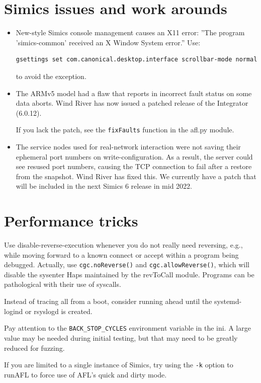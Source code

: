 \documentclass[titlepage]{article}
\begin{document}
\begin{appendices}
\section{Simics issues and work arounds}
\begin{itemize}
\item New-style Simics console management causes an X11 error: ''The program 'simics-common' received an X Window System error.''
Use:
\begin{verbatim}
gsettings set com.canonical.desktop.interface scrollbar-mode normal
\end{verbatim}
\noindent to avoid the exception.
\item The ARMv5 model had a flaw that reports in incorrect fault status on some data aborts.  Wind River has now issued a patched release
of the Integrator (6.0.12).

If you lack the patch, see the {\tt fixFaults} function in the afl.py module.

\item The service nodes used for real-network interaction were not saving their ephemeral port numbers on write-configuration.  As a result,
the server could see resused port numbers, causing the TCP connection to fail after a restore from the snapshot.  Wind River has fixed this.
We currently have a patch that will be included in the next Simics 6 release in mid 2022.
\end{itemize}

\section{Performance tricks}
Use disable-reverse-execution whenever you do not really need reversing, e.g., while moving forward to a known connect or accept
within a program being debugged.  Actually, use {\tt cgc.noReverse()} and {\tt cgc.allowReverse()}, which will disable the sysenter
Haps maintained by the revToCall module.  Programs can be pathological with their use of syscalls.

Instead of tracing all from a boot, consider running ahead until the systemd-logind or rsyslogd is created.

Pay attention to the {\tt BACK\_STOP\_CYCLES} environment variable in the ini.  A large value may be needed during initial testing,
but that may need to be greatly reduced for fuzzing.

If you are limited to a single instance of Simics, try using the {\tt -k} option to runAFL to force use of AFL's quick and dirty mode.


\end{appendices}
\end{document}
